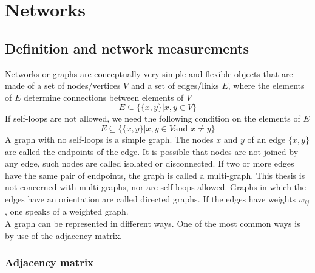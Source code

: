 \documentclass[11 pt , letterpaper , twoside , openright]{book}
\begin{document}


\chapter{Networks}
\label{chap2}



\section{Definition and network measurements}
\label{netDef}

Networks or graphs are conceptually very simple and flexible objects that are made of a set of nodes/vertices $V$ and a set of edges/links $E$, where the elements of $E$ determine connections between elements of $V$ \cite{Costa2018}
\begin{equation}
	E \subseteq \{\{x, y\}| x, y \in V \}
\end{equation}
If self-loops are not allowed, we need the following condition on the elements of $E$
\begin{equation}
	E \subseteq \{\{x, y\}| x, y \in V \text{and\ } x \neq y \}
\end{equation}
A graph with no self-loops is a simple graph. The nodes $x$ and $y$ of an edge $\{x, y\}$ are called the endpoints of the edge. It is possible that nodes are not joined by any edge, such nodes are called isolated or disconnected. If two or more edges have the same pair of endpoints, the graph is called a multi-graph. This thesis is not concerned with multi-graphs, nor are self-loops allowed. Graphs in which the edges have an orientation are called directed graphs. If the edges have weights $w_{ij}$, one speaks of a weighted graph.\\
A graph can be represented in different ways. One of the most common ways is by use of the adjacency matrix.\\

\subsection{Adjacency matrix}
\end{document}
